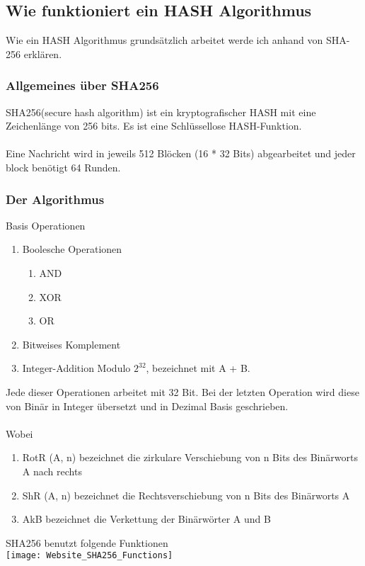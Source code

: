 {\subsection{Wie funktioniert ein HASH Algorithmus}
\label{sec:hash_algo}
Wie ein HASH Algorithmus grundsätzlich arbeitet werde ich anhand von SHA-256 erklären. 
\subsubsection{Allgemeines über SHA256}
\label{sec:hash_sha}
SHA256(secure hash algorithm) ist ein kryptografischer HASH mit eine Zeichenlänge von 256 bits. Es ist eine Schlüssellose HASH-Funktion.
\\ \\
Eine Nachricht wird in jeweils 512 Blöcken (16 * 32 Bits) abgearbeitet und jeder block benötigt 64 Runden.
\subsubsection{Der Algorithmus}
\label{sec:hash_sha_alg}
Basis Operationen
\begin{enumerate}
\item Boolesche Operationen
\begin{enumerate}
\item AND
\item XOR
\item OR
\end{enumerate}
\item Bitweises Komplement
\item Integer-Addition Modulo $2^{32}$, bezeichnet mit A + B.
\end{enumerate}
Jede dieser Operationen arbeitet mit 32 Bit. Bei der letzten Operation wird diese von Binär in Integer übersetzt und in Dezimal Basis geschrieben.\\ \\
Wobei
\begin{enumerate}
\item RotR (A, n) bezeichnet die zirkulare Verschiebung von n Bits des Binärworts A nach rechts
\item ShR (A, n) bezeichnet die Rechtsverschiebung von n Bits des Binärworts A
\item AkB bezeichnet die Verkettung der Binärwörter A und B
\end{enumerate}
SHA256 benutzt folgende Funktionen\\
\texttt{[image: Website\_SHA256\_Functions]}
}
